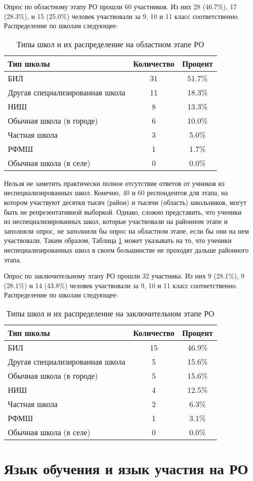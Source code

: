 Опрос по областному этапу РО прошли 60 участников. Из них 28 (46.7\%), 17 (28.3\%), и 15 (25.0\%) человек участвовали за 9, 10 и 11 класс соответственно. Распределение по школам следующее:

\begin{table}[ht]
    \centering
    \begin{tabular}{|l|c|c|}
        \hline
        \textbf{Тип школы} & \textbf{Количество} & \textbf{Процент} \\ \hline
        БИЛ & 31 & 51.7\% \\ \hline
        Другая специализированная школа & 11 & 18.3\% \\ \hline
        НИШ & 8 & 13.3\% \\ \hline
        Обычная школа (в городе) & 6 & 10.0\% \\ \hline
        Частная школа & 3 & 5.0\% \\ \hline
        РФМШ & 1 & 1.7\% \\ \hline
        Обычная школа (в селе) & 0 & 0.0\% \\ \hline
    \end{tabular}
    \caption{Типы школ и их распределение на областном этапе РО}
    \label{tab:obl-schools}
\end{table}

Нельзя не заметить практически полное отсутствие ответов от учников из неспециализированных школ. Конечно, 40 и 60 респондентов для этапа, на котором участвуют десятки тысяч (район) и тысячи (область) школьников, могут быть не репрезентативной выборкой. Однако, сложно представить, что ученики из неспециализированных школ, которые участвовали на районном этапе и заполняли опрос, не заполнили бы опрос на областном этапе, если бы они на нем участвовали. Таким образом, Таблица \ref{tab:obl-schools} может указывать на то, что ученики неспециализированных школ в своем большинстве не проходят дальше районного этапа.

Опрос по заключительному этапу РО прошли 32 участника. Из них 9 (28.1\%), 9 (28.1\%) и 14 (43.8\%) человек участвовали за 9, 10 и 11 класс соответственно. Распределение по школам следующее:

\begin{table}[ht]
    \centering
    \begin{tabular}{|l|c|c|}
    \hline
    \textbf{Тип школы} & \textbf{Количество} & \textbf{Процент} \\ \hline
    БИЛ & 15 & 46.9\% \\ \hline
    Другая специализированная школа & 5 & 15.6\% \\ \hline
    Обычная школа (в городе) & 5 & 15.6\% \\ \hline
    НИШ & 4 & 12.5\% \\ \hline
    Частная школа & 2 & 6.3\% \\ \hline
    РФМШ & 1 & 3.1\% \\ \hline
    Обычная школа (в селе) & 0 & 0.0\% \\ \hline
    \end{tabular}
    \caption{Типы школ и их распределение на заключительном этапе РО}
    \label{tab:respa-schools}
\end{table}

\section{Язык обучения и язык участия на РО}
